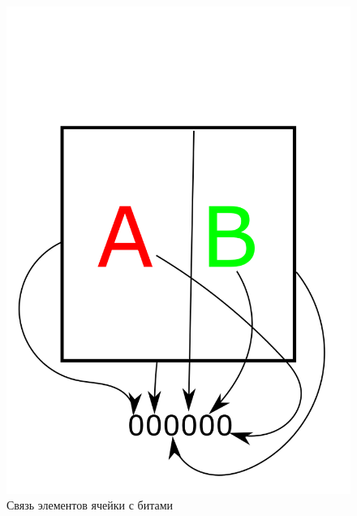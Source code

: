 \documentclass[12pt]{article}
\begin{document}
  \begin{minipage}{\linewidth}
      \centering
      \begin{minipage}{0.4\linewidth}
          \begin{figure}[H]
              \includegraphics[width=\linewidth]{draw1}
              \caption{Связь элементов ячейки с битами}
              \label{fig:bits}
          \end{figure}
      \end{minipage}
      \hspace{0.15\linewidth}
      \begin{minipage}{0.4\linewidth}
          \begin{figure}[H]

\end{figure}
\end{minipage}
\end{minipage}
\end{document}
